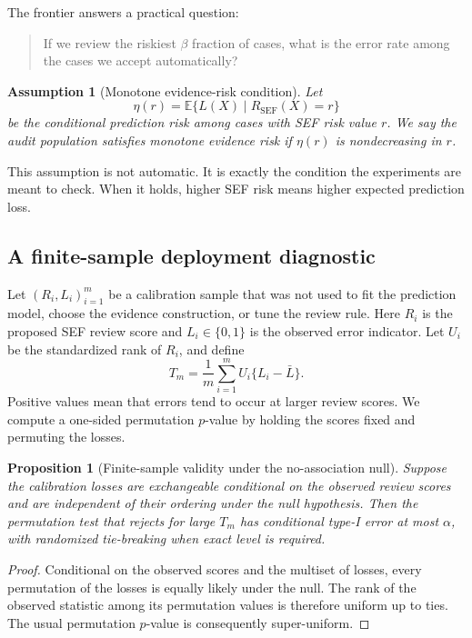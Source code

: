 \documentclass[11pt]{article}
\newtheorem{assumption}{Assumption}
\newtheorem{proposition}{Proposition}
\newcommand{\E}{\mathbb{E}}
\begin{document}
The frontier answers a practical question:

\begin{quote}
If we review the riskiest $\beta$ fraction of cases, what is the error rate among the cases we accept automatically?
\end{quote}

\begin{assumption}[Monotone evidence-risk condition]
Let
\[
\eta(r)=\E\{L(X)\mid R_{\mathrm{SEF}}(X)=r\}
\]
be the conditional prediction risk among cases with SEF risk value $r$. We say the audit population satisfies monotone evidence risk if $\eta(r)$ is nondecreasing in $r$.
\end{assumption}

This assumption is not automatic. It is exactly the condition the experiments are meant to check. When it holds, higher SEF risk means higher expected prediction loss.

\subsection{A finite-sample deployment diagnostic}

Let $(R_i,L_i)_{i=1}^m$ be a calibration sample that was not used to fit the prediction model, choose the evidence construction, or tune the review rule. Here $R_i$ is the proposed SEF review score and $L_i\in\{0,1\}$ is the observed error indicator. Let $U_i$ be the standardized rank of $R_i$, and define
\[
T_m=\frac{1}{m}\sum_{i=1}^m U_i\{L_i-\bar L\}.
\]
Positive values mean that errors tend to occur at larger review scores. We compute a one-sided permutation $p$-value by holding the scores fixed and permuting the losses.

\begin{proposition}[Finite-sample validity under the no-association null]
Suppose the calibration losses are exchangeable conditional on the observed review scores and are independent of their ordering under the null hypothesis. Then the permutation test that rejects for large $T_m$ has conditional type-I error at most $\alpha$, with randomized tie-breaking when exact level is required.
\end{proposition}

\begin{proof}
Conditional on the observed scores and the multiset of losses, every permutation of the losses is equally likely under the null. The rank of the observed statistic among its permutation values is therefore uniform up to ties. The usual permutation $p$-value is consequently super-uniform.
\end{proof}
\end{document}
